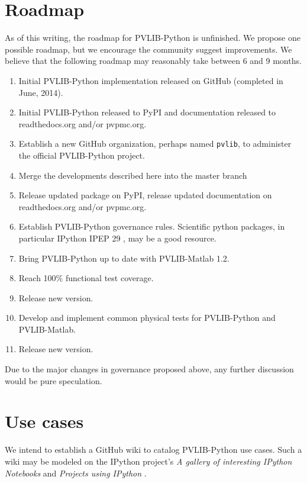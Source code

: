 \documentclass[conference]{IEEEtran}
\begin{document}
\section{Roadmap}

As of this writing, the roadmap for PVLIB-Python is unfinished. 
We propose one possible roadmap, but we encourage the community suggest improvements. 
We believe that the following roadmap may reasonably take between 6 and 9 months. 

\begin{enumerate}
\item Initial PVLIB-Python implementation released on GitHub (completed in June, 2014).
\item Initial PVLIB-Python released to PyPI and documentation released to readthedocs.org and/or pvpmc.org.
\item Establish a new GitHub organization, perhaps named \texttt{pvlib}, to administer the official PVLIB-Python project.
\item Merge the developments described here into the master branch
\item Release updated package on PyPI, release updated documentation on readthedocs.org and/or pvpmc.org.
\item Establish PVLIB-Python governance rules. Scientific python packages, in particular IPython IPEP 29 \cite{ipython-gov}, may be a good resource.
\item Bring PVLIB-Python up to date with PVLIB-Matlab 1.2.
\item Reach 100\% functional test coverage.
\item Release new version.
\item Develop and implement common physical tests for PVLIB-Python and PVLIB-Matlab.
\item Release new version.
\end{enumerate}

Due to the major changes in governance proposed above, any further discussion would be pure speculation.



\section{Use cases}

We intend to establish a GitHub wiki to catalog PVLIB-Python use cases. Such a wiki may be modeled on the IPython project's \emph{A gallery of interesting IPython Notebooks} and \emph{Projects using IPython} \cite{ipython-wiki}. 
\end{document}
